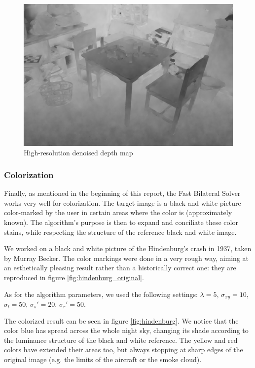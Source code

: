 \documentclass{article}
\begin{document}
\begin{figure}
    \centering
    \includegraphics[width=12cm]{../code/results/depth_superresolution_room_new.png}
    \caption{High-resolution denoised depth map}
    \label{fig:room}
\end{figure}

\subsubsection{Colorization}

Finally, as mentioned in the beginning of this report, the Fast Bilateral Solver works very well for colorization. The target image is a black and white picture color-marked by the user in certain areas where the color is (approximately known). The algorithm's purpose is then to expand and conciliate these color stains, while respecting the structure of the reference black and white image.

\medskip

We worked on a black and white picture of the Hindenburg's crash in 1937, taken by Murray Becker. The color markings were done in a very rough way, aiming at an esthetically pleasing result rather than a historically correct one: they are reproduced in figure \ref{fig:hindenburg_original}.

As for the algorithm parameters, we used the following settings: $\lambda = 5$, $\sigma_{xy} = 10$, $\sigma_l = 50$, $\sigma_s' = 20$, $\sigma_r' = 50$.

\medskip

The colorized result can be seen in figure \ref{fig:hindenburg}. We notice that the color blue has spread across the whole night sky, changing its shade according to the luminance structure of the black and white reference. The yellow and red colors have extended their areas too, but always stopping at sharp edges of the original image (e.g. the limits of the aircraft or the smoke cloud).
\end{document}
